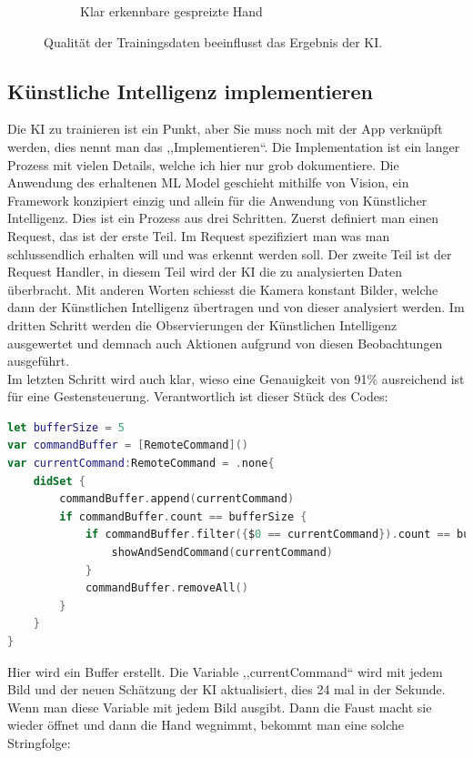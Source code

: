 \documentclass[12pt]{article}
\begin{document}
\begin{figure}
\begin{subfigure}[b]{0.475\textwidth}
            \caption[]%
            {{\small Klar erkennbare gespreizte Hand}}    
            \label{fig:klaroffen}
        \end{subfigure}
        \caption[]
        {\small Qualität der Trainingsdaten beeinflusst das Ergebnis der KI.} 
        \label{fig:qualityoftraining}
    \end{figure}
\newpage
\subsection{Künstliche Intelligenz implementieren}
Die KI zu trainieren ist ein Punkt, aber Sie muss noch mit der App verknüpft werden, dies nennt man das ,,Implementieren``. Die Implementation ist ein langer Prozess mit vielen Details, welche ich hier nur grob dokumentiere. Die Anwendung des erhaltenen ML Model geschieht mithilfe von Vision, ein Framework konzipiert einzig und allein für die Anwendung von Künstlicher Intelligenz. Dies ist ein Prozess aus drei Schritten. Zuerst definiert man einen Request, das ist der erste Teil. Im Request spezifiziert man was man schlussendlich erhalten will und was erkennt werden soll. Der zweite Teil ist der Request Handler, in diesem Teil wird der KI die zu analysierten Daten überbracht. Mit anderen Worten schiesst die Kamera konstant Bilder, welche dann der Künstlichen Intelligenz übertragen und von dieser analysiert werden. Im dritten Schritt werden die Observierungen der Künstlichen Intelligenz ausgewertet und demnach auch Aktionen aufgrund von diesen Beobachtungen ausgeführt. \cite{gesturecontrolvideo}\\ Im letzten Schritt wird auch klar, wieso eine Genauigkeit von 91\% ausreichend ist für eine Gestensteuerung. Verantwortlich ist dieser Stück des Codes: 
\begin{lstlisting}[language=Swift,caption={KI Buffer},label={lst:buffer}]
let bufferSize = 5
var commandBuffer = [RemoteCommand]()
var currentCommand:RemoteCommand = .none{
    didSet {
        commandBuffer.append(currentCommand)
        if commandBuffer.count == bufferSize {
            if commandBuffer.filter({$0 == currentCommand}).count == bufferSize{
                showAndSendCommand(currentCommand)
            }
            commandBuffer.removeAll()
        }
    }
}
\end{lstlisting}
Hier wird ein Buffer erstellt. Die Variable ,,currentCommand`` wird mit jedem Bild und der neuen Schätzung der KI aktualisiert, dies 24 mal in der Sekunde. Wenn man diese Variable mit jedem Bild ausgibt. Dann die Faust macht sie wieder öffnet und dann die Hand wegnimmt, bekommt man eine solche Stringfolge:
\end{document}
